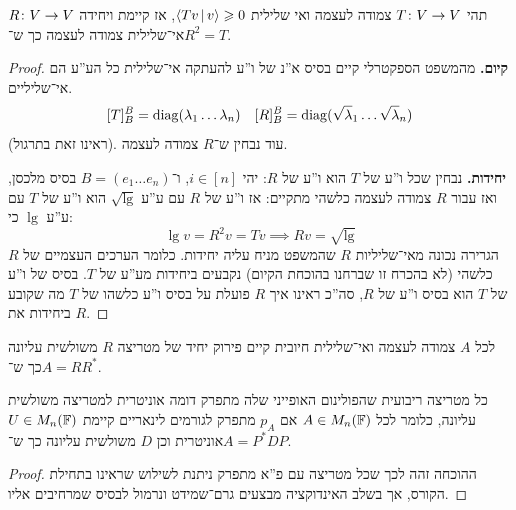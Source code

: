 \documentclass[name=רשימות אלגברה לינארית 2א]{../../../tex/classes/megasumPreamble}
\begin{document}
	
	\begin{Theorem}
		תהי $T \co V \to V$ צמודה לעצמה ואי שלילית $\mut{Tv}{v} \ge 0$, אז קיימת ויחידה $R \co V \to V$ אי־שלילית צמודה לעצמה כך ש־$R^2 = T$. 
	\end{Theorem}
	
	\begin{proof}
		\textbf{קיום. }
		מהמשפט הספקטרלי קיים בסיס א''נ של ו''ע להעתקה אי־שלילית כל הע''ע הם אי־שליליים. 
		\[ [T]^{B}_B = \diag(\lg_1 \dots \lg_n) \quad [R]_B^B = \diag(\sqrt \lg_1 \dots \sqrt \lg_n) \]
		(ראינו זאת בתרגול). עוד נבחין ש־$R$ צמודה לעצמה. 
		
		\textbf{יחידות. }נבחין שכל ו''ע של $T$ הוא ו''ע של $R$: יהי $i \in [n]$, ו־$B = (e_1 \dots e_n)$ בסיס מלכסן, ואז עבור $R$ צמודה לעצמה כלשהי מתקיים: אז ו''ע של $R$ עם ע''ע $\sqrt \lg$ הוא ו''ע של $T$ עם ע''ע $\lg$ כי: 
		\[ \lg v = R^2v = Tv \implies Rv = \sqrt \lg \]
		הגרירה נכונה מאי־שליליות $R$ שהמשפט מניח עליה יחידות. כלומר הערכים העצמיים של $R$ כלשהי (לא בהכרח זו שברחנו בהוכחת הקיום) נקבעים ביחידות מע''ע של $T$. בסיס של ו''ע של $T$ הוא בסיס ו''ע של $R$, סה''כ ראינו איך $R$ פועלת על בסיס ו''ע כלשהו של $T$ מה שקובע ביחידות את $R$. 
	\end{proof}
	
	
	\begin{Collary}
		לכל $A$ צמודה לעצמה ואי־שלילית חיובית קיים פירוק יחיד של מטריצה $R$ משולשית עליונה כך ש־$A=RR^*$. 
	\end{Collary}
	
	\begin{Theorem}
		כל מטריצה ריבועית שהפולינום האופייני שלה מתפרק דומה אוניטרית למטריצה משולשית עליונה, כלומר לכל $A \in M_n(\F)$ אם $p_A$ מתפרק לגורמים לינאריים קיימת $U \in M_n(\F)$ אוניטרית וכן $D$ משולשית עליונה כך ש־$A = P^*DP$. 
	\end{Theorem}\begin{proof}
		ההוכחה זהה לכך שכל מטריצה עם פ''א מתפרק ניתנת לשילוש שראינו בתחילת הקורס, אך בשלב האינדוקציה מבצעים גרם־שמידט ונרמול לבסיס שמרחיבים אליו. 
	\end{proof}
	
\end{document}
